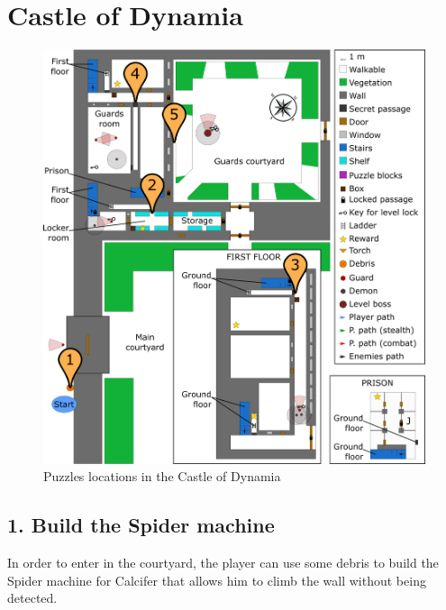 \section{Castle of Dynamia}

\begin{figure}[H]
  \centering
  \includegraphics[width=\textwidth]{Images/Maps/castleOfDynamiaPuzzles}
  \caption{Puzzles locations in the Castle of Dynamia}
\end{figure}

\subsection{1. Build the Spider machine}


In order to enter in the courtyard, the player can use some debris to build the Spider machine for Calcifer that allows him to climb the wall without being detected.



